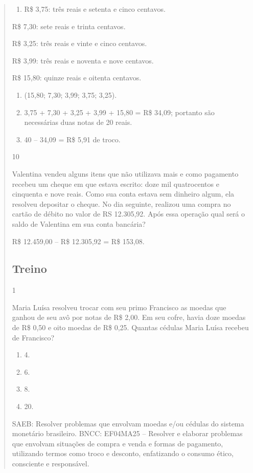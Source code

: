\begin{mdframed}[linewidth=2pt,linecolor=salmao,roundcorner=2pt]
\begin{itemize}
{\begin{itemize}
\begin{escolha}
{\begin{quote}
{\begin{escolha}
\begin{enumerate}
\item
  R\$ 3,75: três reais e setenta e cinco centavos.
\end{enumerate}

R\$ 7,30: sete reais e trinta centavos.

R\$ 3,25: três reais e vinte e cinco centavos.

R\$ 3,99: três reais e noventa e nove centavos.

R\$ 15,80: quinze reais e oitenta centavos.

\begin{enumerate}
\item
  (15,80; 7,30; 3,99; 3,75; 3,25).
\item
  3,75 + 7,30 + 3,25 + 3,99 + 15,80 = R\$ 34,09; portanto são necessárias duas notas de 20
  reais.
\item
  40 -- 34,09 = R\$ 5,91 de troco.
\end{enumerate}

\num{10}

Valentina vendeu alguns itens que não utilizava mais e como pagamento
recebeu um cheque em que estava escrito: doze mil quatrocentos e
cinquenta e nove reais. Como sua conta estava sem dinheiro algum, ela
resolveu depositar o cheque. No dia seguinte, realizou uma compra no
cartão de débito no valor de RS 12.305,92. Após essa operação qual será o
saldo de Valentina em sua conta bancária?

R\$ 12.459,00 -- R\$ 12.305,92 = R\$ 153,08.

\subsection{Treino}

\num{1}

Maria Luísa resolveu trocar com seu primo Francisco as moedas que ganhou de seu avô por notas de
R\$ 2,00. Em seu cofre, havia doze moedas de R\$ 0,50
e oito moedas de R\$ 0,25. Quantas cédulas Maria Luísa recebeu de Francisco?

\begin{enumerate}
\item
  4.
\item
  6.
\item
  8.
\item
  20.
\end{enumerate}

SAEB: Resolver problemas que envolvam moedas e/ou cédulas do sistema monetário brasileiro.
BNCC: EF04MA25 -- Resolver e elaborar problemas que envolvam situações de compra e venda e formas
de pagamento, utilizando termos como troco e desconto, enfatizando o consumo ético, consciente e
responsável.


\end{escolha}}
\end{quote}}
\end{escolha}
\end{itemize}}
\end{itemize}
\end{mdframed}
